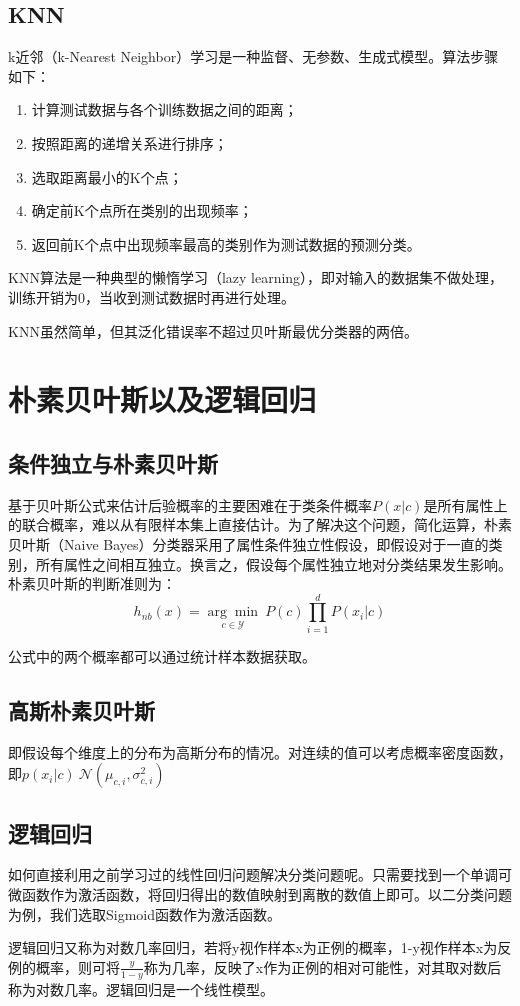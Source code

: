 \documentclass[12pt]{article}
\begin{document}
\subsection{KNN}
k近邻（k-Nearest Neighbor）学习是一种监督、无参数、生成式模型。算法步骤如下：
\begin{enumerate}
    \item 计算测试数据与各个训练数据之间的距离；
    \item 按照距离的递增关系进行排序；
    \item 选取距离最小的K个点；
    \item 确定前K个点所在类别的出现频率；
    \item 返回前K个点中出现频率最高的类别作为测试数据的预测分类。
\end{enumerate}\par
KNN算法是一种典型的懒惰学习（lazy learning），即对输入的数据集不做处理，训练开销为0，当收到测试数据时再进行处理。\par
KNN虽然简单，但其泛化错误率不超过贝叶斯最优分类器的两倍。\par
\section{朴素贝叶斯以及逻辑回归}
\subsection{条件独立与朴素贝叶斯}
基于贝叶斯公式来估计后验概率的主要困难在于类条件概率$P(x|c)$是所有属性上的联合概率，难以从有限样本集上直接估计。为了解决这个问题，简化运算，朴素贝叶斯（Naive Bayes）分类器采用了属性条件独立性假设，即假设对于一直的类别，所有属性之间相互独立。换言之，假设每个属性独立地对分类结果发生影响。朴素贝叶斯的判断准则为：
\[h_{nb}(x)=\underset{c\in\mathcal{Y}}{\arg \min}\ P(c)\prod_{i=1}^dP(x_i|c)\]\par
公式中的两个概率都可以通过统计样本数据获取。\par
\subsection{高斯朴素贝叶斯}
即假设每个维度上的分布为高斯分布的情况。对连续的值可以考虑概率密度函数，即$p(x_i|c)~\mathcal{N}(\mu_{c,i},\sigma^2_{c,i})$\par
\subsection{逻辑回归}
如何直接利用之前学习过的线性回归问题解决分类问题呢。只需要找到一个单调可微函数作为激活函数，将回归得出的数值映射到离散的数值上即可。以二分类问题为例，我们选取Sigmoid函数作为激活函数。\par
逻辑回归又称为对数几率回归，若将y视作样本x为正例的概率，1-y视作样本x为反例的概率，则可将$\frac{y}{1-y}$称为几率，反映了x作为正例的相对可能性，对其取对数后称为对数几率。逻辑回归是一个线性模型。\par
\end{document}
